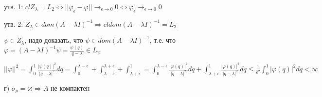 \documentclass[russian]{article}
\begin{document}
утв. 1: $cl Z_\lambda = L_2 \Leftrightarrow ||\varphi_\epsilon - \varphi || \rightarrow _ {\epsilon \rightarrow 0} 0 \Leftrightarrow \varphi_ \epsilon \rightarrow _{\epsilon \rightarrow 0} 0$

утв. 2: $Z_\lambda \in dom(A-\lambda I)^{-1} \Rightarrow cl dom (A-\lambda I)^{-1} = L_2$

$\psi \in Z_\lambda$, надо доказать, что $\psi \in dom (A-\lambda I)^{-1}$, т.е. что $\varphi = (A-\lambda I)^{-1}\psi=\frac{\psi(q)}{q-\lambda} \in L_2$

$||\varphi||^2 = \int_0^1\frac{|\psi(q)|^2}{|q-\lambda|^2}dq = \int_0^{\lambda - \epsilon} + \int_{\lambda - \epsilon}^{\lambda + \epsilon} + \int_{\lambda + \epsilon}^1=\int_0^{\lambda - \epsilon}\frac{|\varphi(q)|^2}{|q-\lambda|^2}dq+\int_{\lambda + \epsilon}^1\frac{|\varphi(q)|^2}{|q-\lambda|^2}dq\le\frac{1}{\epsilon^2}\int_0^1|\varphi(q)|^2dq<\infty$

г) $\sigma_p = \varnothing \Rightarrow A$ не компактен
\end{document}
